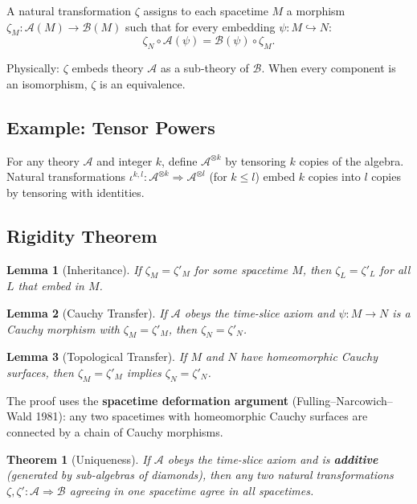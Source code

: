 \documentclass[11pt,a4paper]{article}
\newtheorem{theorem}{Theorem}[section]
\newtheorem{lemma}{Lemma}[section]
\begin{document}
A natural transformation $\zeta$ assigns to each spacetime $M$ a morphism
$\zeta_M: \mathscr{A}(M) \to \mathscr{B}(M)$ such that for every embedding
$\psi: M \hookrightarrow N$:
\begin{equation}
  \zeta_N \circ \mathscr{A}(\psi) = \mathscr{B}(\psi) \circ \zeta_M.
\end{equation}

Physically: $\zeta$ embeds theory $\mathscr{A}$ as a sub-theory of $\mathscr{B}$.
When every component is an isomorphism, $\zeta$ is an equivalence.

\subsection{Example: Tensor Powers}

For any theory $\mathscr{A}$ and integer $k$, define $\mathscr{A}^{\otimes k}$
by tensoring $k$ copies of the algebra. Natural transformations
$\iota^{k,l}: \mathscr{A}^{\otimes k} \Rightarrow \mathscr{A}^{\otimes l}$
(for $k \leq l$) embed $k$ copies into $l$ copies by tensoring with
identities.

\subsection{Rigidity Theorem}

\begin{lemma}[Inheritance]
If $\zeta_M = \zeta'_M$ for some spacetime $M$, then $\zeta_L = \zeta'_L$
for all $L$ that embed in $M$.
\end{lemma}

\begin{lemma}[Cauchy Transfer]
If $\mathscr{A}$ obeys the time-slice axiom and $\psi: M \to N$ is a Cauchy
morphism with $\zeta_M = \zeta'_M$, then $\zeta_N = \zeta'_N$.
\end{lemma}

\begin{lemma}[Topological Transfer]
If $M$ and $N$ have homeomorphic Cauchy surfaces, then $\zeta_M = \zeta'_M$
implies $\zeta_N = \zeta'_N$.
\end{lemma}

The proof uses the \textbf{spacetime deformation argument} (Fulling--Narcowich--Wald 1981):
any two spacetimes with homeomorphic Cauchy surfaces are connected by a chain
of Cauchy morphisms.

\begin{theorem}[Uniqueness]
If $\mathscr{A}$ obeys the time-slice axiom and is \textbf{additive}
(generated by sub-algebras of diamonds), then any two natural transformations
$\zeta, \zeta': \mathscr{A} \Rightarrow \mathscr{B}$ agreeing in \emph{one}
spacetime agree in \emph{all} spacetimes.
\end{theorem}
\end{document}

